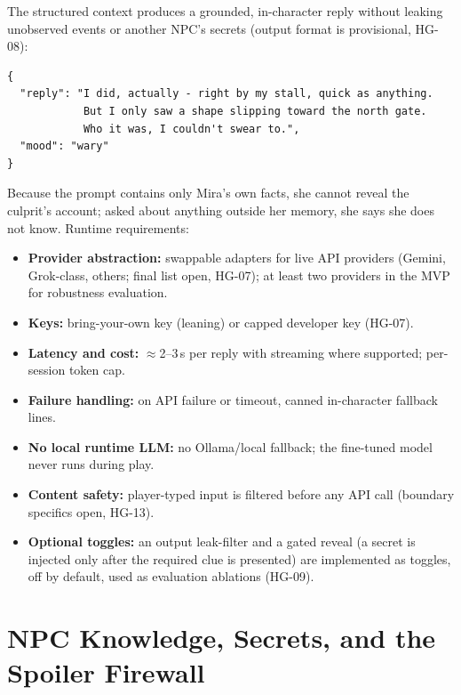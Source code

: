 \documentclass[11pt,a4paper]{article}
\begin{document}
The structured context produces a grounded, in-character reply without leaking unobserved events or another NPC's secrets (output format is provisional, HG-08):

\begin{lstlisting}[caption={Example Grounded Response Output}]
{
  "reply": "I did, actually - right by my stall, quick as anything.
            But I only saw a shape slipping toward the north gate.
            Who it was, I couldn't swear to.",
  "mood": "wary"
}
\end{lstlisting}

Because the prompt contains only Mira's own facts, she cannot reveal the culprit's account; asked about anything outside her memory, she says she does not know. Runtime requirements:
\begin{itemize}
    \item \textbf{Provider abstraction:} swappable adapters for live API providers (Gemini, Grok-class, others; final list open, HG-07); at least two providers in the MVP for robustness evaluation.
    \item \textbf{Keys:} bring-your-own key (leaning) or capped developer key (HG-07).
    \item \textbf{Latency and cost:} $\approx$2--3\,s per reply with streaming where supported; per-session token cap.
    \item \textbf{Failure handling:} on API failure or timeout, canned in-character fallback lines.
    \item \textbf{No local runtime LLM:} no Ollama/local fallback; the fine-tuned model never runs during play.
    \item \textbf{Content safety:} player-typed input is filtered before any API call (boundary specifics open, HG-13).
    \item \textbf{Optional toggles:} an output leak-filter and a gated reveal (a secret is injected only after the required clue is presented) are implemented as toggles, off by default, used as evaluation ablations (HG-09).
\end{itemize}

\section{NPC Knowledge, Secrets, and the Spoiler Firewall}
\label{sec:knowledge}
\end{document}
